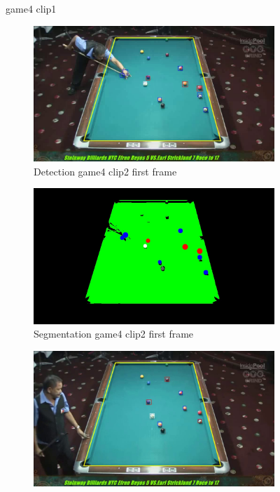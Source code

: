 \begin{figure}[H]
	\caption{game4 clip1}
\end{figure}


\begin{figure}[H]
	\centering
	\begin{subfigure}[b]{0.48\textwidth}
		\centering
		\includegraphics[width=\textwidth]{images/Detection/game4_clip2_detected_balls_first_frame.jpg}
		\caption{Detection game4 clip2 first frame}
		\label{fig: game4_clip2_first_frame_detected}
	\end{subfigure}
	\begin{subfigure}[b]{0.48\textwidth}
		\centering
		\includegraphics[width=\textwidth]{images/Segmentation/game4_clip2_segmented_balls_first_frame.jpg}
		\caption{Segmentation game4 clip2 first frame}
		\label{fig: game4_clip2_first_frame_segmented}
	\end{subfigure}
	\begin{subfigure}[b]{0.48\textwidth}
		\centering
		\includegraphics[width=\textwidth]{images/Detection/game4_clip2_detected_balls_last_frame.jpg}

\end{subfigure}
\end{figure}
